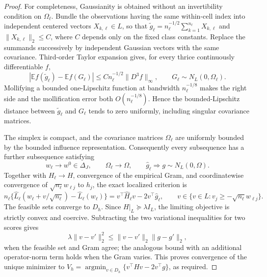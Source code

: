 \documentclass{article}
\begin{document}
\begin{proof}
For completeness, Gaussianity is obtained without an invertibility condition on \(\Omega_\ell\).  Bundle the observations having the same within-cell index into independent centered vectors \(X_{k,\ell}\in L\), so that
\(\widetilde g_\ell=n_\ell^{-1/2}\sum_{k=1}^{n_\ell}X_{k,\ell}\) and \(\|X_{k,\ell}\|_2\leq C\), where \(C\) depends only on the fixed class constants.  Replace the summands successively by independent Gaussian vectors with the same covariance.  Third-order Taylor expansion gives, for every thrice continuously differentiable \(f\),
\[
 \left|\mathbb Ef(\widetilde g_\ell)-\mathbb Ef(G_\ell)\right|
 \leq C n_\ell^{-1/2}\|D^3f\|_\infty,
 \qquad G_\ell\sim N_L(0,\Omega_\ell).
\]
Mollifying a bounded one-Lipschitz function at bandwidth
\(n_\ell^{-1/8}\) makes the right side and the mollification error both \(O(n_\ell^{-1/8})\).  Hence the bounded-Lipschitz distance between \(\widetilde g_\ell\) and \(G_\ell\) tends to zero uniformly, including singular covariance matrices.

The simplex is compact, and the covariance matrices \(\Omega_\ell\) are uniformly bounded by the bounded influence representation.  Consequently every subsequence has a further subsequence satisfying
\[
 w_\ell\longrightarrow w^0\in\Delta_J,
 \qquad \Omega_\ell\longrightarrow\Omega,
 \qquad \widehat g_\ell\Rightarrow g\sim N_L(0,\Omega).
\]
Together with \(H_\ell\to H\), convergence of the empirical Gram, and coordinatewise convergence of \(\sqrt{n_\ell}w_{\ell j}\) to \(h_j\), the exact localized criterion is
\[
 n_\ell\{\widehat L_\ell(w_\ell+v/\sqrt{n_\ell})-
              \widehat L_\ell(w_\ell)\}
 =v^\top\widehat H_\ell v-2v^\top\widehat g_\ell,
 \qquad v\in\{v\in L:v_j\geq-\sqrt{n_\ell}w_{\ell j}\}.
\]
The feasible sets converge to \(D_h\).  Since \(H|_L\succeq\lambda I_L\), the limiting objective is strictly convex and coercive.  Subtracting the two variational inequalities for two scores gives
\[
 \lambda\|v-v'\|_2^2
 \leq \|v-v'\|_2\|g-g'\|_2,
\]
when the feasible set and Gram agree; the analogous bound with an additional operator-norm term holds when the Gram varies.  This proves convergence of the unique minimizer to
\(V_h=\operatorname*{argmin}_{v\in D_h}
\{v^\top Hv-2v^\top g\}\), as required.
\end{proof}
\end{document}
